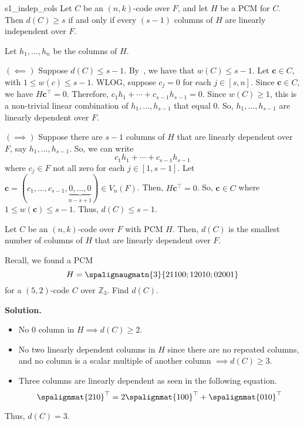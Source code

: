 
\begin{Theorem}{}{s1_indep_cols}
    Let $ C $ be an $ (n,k) $-code over $ F $, and let $ H $ be a PCM
    for $ C $. Then $ d(C)\geqslant s $ if and only if every $ (s-1) $ columns
    of $ H $ are linearly independent over $ F $.
\end{Theorem}

\begin{Proof}{}{}
    Let $ h_1,\ldots ,h_n $ be the columns of $ H $.

    $ (\impliedby) $ Suppose $ d(C)\leqslant s-1 $. By~,
    we have that $ w(C)\leqslant s-1 $.
    Let $ \symbf{c}\in C $, with $ 1\leqslant w(c)\leqslant s-1 $. WLOG, suppose
    $ c_j=0 $ for each $ j\in[s,n] $. Since $ \symbf{c}\in C $,
    we have $ H\symbf{c}^{\top}=0 $. Therefore,
    $ c_1h_1+\cdots+c_{s-1}h_{s-1}=0 $.
    Since $ w(C)\geqslant 1 $, this is a non-trivial linear combination
    of $ h_1,\ldots ,h_{s-1} $ that equal $ 0 $. So,
    $ h_1,\ldots ,h_{s-1} $ are linearly dependent over $ F $.

    $ (\implies) $ Suppose there are $ s-1 $ columns of $ H $ that
    are linearly dependent over $ F $, say $ h_1,\ldots ,h_{s-1} $. So,
    we can write
    \[ c_1h_1+\cdots+c_{s-1}h_{s-1} \]
    where $ c_j\in F $ not all zero for each $ j\in[1,s-1] $.
    Let $ \symbf{c}=(c_1,\ldots ,c_{s-1},
        \underbrace{0,\ldots,0}_{n-s+1})\in V_n(F) $. Then,
    $ H\symbf{c}^{\top}=0 $. So, $ \symbf{c}\in C $ where $ 1\leqslant w(\symbf{c})\leqslant s-1 $.
    Thus, $ d(C)\leqslant s-1 $.
\end{Proof}

\begin{Corollary}{}{}
    Let $ C $ be an $ (n,k) $-code over $ F $ with PCM $ H $. Then,
    $ d(C) $ is the smallest number of columns of $ H $ that
    are linearly dependent over $ F $.
\end{Corollary}

\begin{Example}{}{}
    Recall, we found a PCM
    \[ H=\spalignaugmatn{3}{
            2 1 1 0 0;
            1 2 0 1 0;
            0 2 0 0 1} \]
    for a $ (5,2) $-code $ C $ over $ \mathbb{Z}_3 $. Find $ d(C) $.

    \textbf{Solution.}
    \begin{itemize}
        \item No $ 0 $ column in $ H\implies d(C)\geqslant 2 $.
        \item No two linearly dependent columns in $ H $ since there are
              no repeated columns, and no column is a scalar multiple of another
              column $ \implies d(C)\geqslant 3 $.
        \item Three columns are linearly dependent as seen in the following equation.
              \[ \spalignmat{2 1 0}^\top=2\spalignmat{1 0 0}^\top+\spalignmat{0 1 0}^\top \]
    \end{itemize}
    Thus, $ d(C)=3 $.
\end{Example}

